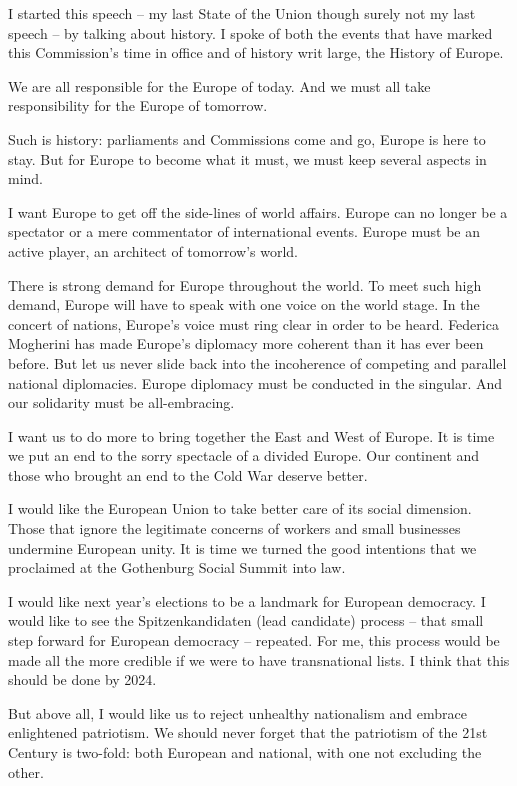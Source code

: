\documentclass[a4paper,11pt]{article}
\begin{document}
I started this speech – my last State of the Union though surely not my last speech – by talking about history. I spoke of both the events that have marked this Commission's time in office and of history writ large, the History of Europe.

We are all responsible for the Europe of today. And we must all take responsibility for the Europe of tomorrow.

Such is history: parliaments and Commissions come and go, Europe is here to stay. But for Europe to become what it must, we must keep several aspects in mind.

I want Europe to get off the side-lines of world affairs. Europe can no longer be a spectator or a mere commentator of international events. Europe must be an active player, an architect of tomorrow's world.

There is strong demand for Europe throughout the world. To meet such high demand, Europe will have to speak with one voice on the world stage. In the concert of nations, Europe's voice must ring clear in order to be heard. Federica Mogherini has made Europe's diplomacy more coherent than it has ever been before. But let us never slide back into the incoherence of competing and parallel national diplomacies. Europe diplomacy must be conducted in the singular. And our solidarity must be all-embracing.

I want us to do more to bring together the East and West of Europe. It is time we put an end to the sorry spectacle of a divided Europe. Our continent and those who brought an end to the Cold War deserve better.

I would like the European Union to take better care of its social dimension. Those that ignore the legitimate concerns of workers and small businesses undermine European unity. It is time we turned the good intentions that we proclaimed at the Gothenburg Social Summit into law.

I would like next year's elections to be a landmark for European democracy. I would like to see the Spitzenkandidaten (lead candidate) process – that small step forward for European democracy – repeated. For me, this process would be made all the more credible if we were to have transnational lists. I think that this should be done by 2024.

But above all, I would like us to reject unhealthy nationalism and embrace enlightened patriotism. We should never forget that the patriotism of the 21st Century is two-fold: both European and national, with one not excluding the other.
\end{document}
